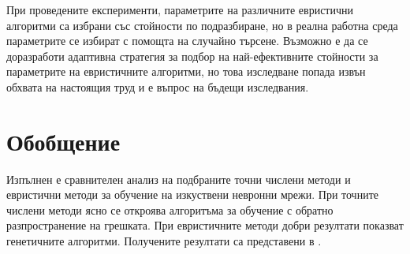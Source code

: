 При проведените експерименти, параметрите на различните евристични алгоритми са избрани със стойности по подразбиране, но в реална работна среда параметрите се избират с помощта на случайно търсене. Възможно е да се доразработи адаптивна стратегия за подбор на най-ефективните стойности за параметрите на евристичните алгоритми, но това изследване попада извън обхвата на настоящия труд и е въпрос на бъдещи изследвания. 

\section{Обобщение}

Изпълнен е сравнителен анализ на подбраните точни числени методи и евристични методи за обучение на изкуствени невронни мрежи. При точните числени методи ясно се откроява алгоритъма за обучение с обратно разпространение на грешката. При евристичните методи добри резултати показват генетичните алгоритми. Получените резултати са представени в \cite{Tomov-08}.

